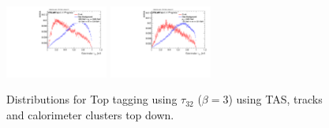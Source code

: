 \begin{figure}[H]
\includegraphics[width=0.3\textwidth]{sascha_input/Appendix/Distributions/top/distributions/beta3/h_recoJet_nSub32_3_bin5.pdf} \hspace{6mm}
\includegraphics[width=0.3\textwidth]{sascha_input/Appendix/Distributions/top/distributions/beta3/h_recoJet_nSub32_3_bin6.pdf}
\caption{{Distributions for Top tagging using $\tau_{32}$ ($\beta=3$) using TAS, tracks and calorimeter clusters top down.}}
\end{figure}

